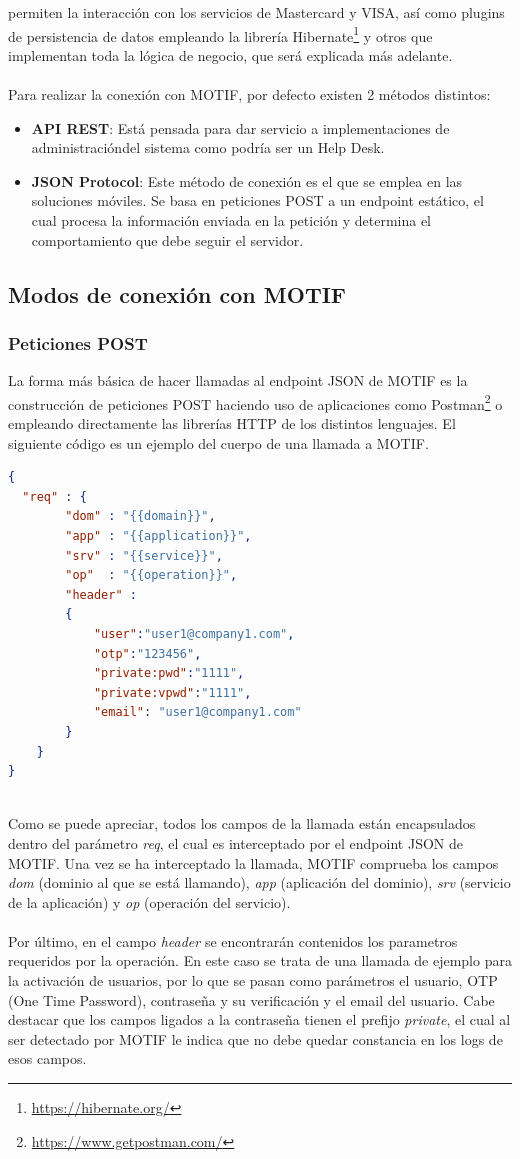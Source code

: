 \documentclass[a4paper, 12pt]{article}
\begin{document}
permiten la interacción con los servicios de Mastercard y VISA, así como plugins de persistencia de datos empleando
la librería Hibernate\footnote{\url{https://hibernate.org/}} y otros que implementan toda la lógica de negocio, que será explicada más adelante.
\\
\\
Para realizar la conexión con MOTIF, por defecto existen 2 métodos distintos:
\begin{itemize}
\item \textbf{API REST}: Está pensada para dar servicio a implementaciones de administracióndel sistema como podría ser un Help Desk.
\item \textbf{JSON Protocol}: Este método de conexión es el que se emplea en las soluciones móviles. Se basa en peticiones POST a un endpoint estático, el cual procesa la información enviada en la petición y determina el comportamiento que debe seguir el servidor.
\end{itemize}

\subsection{Modos de conexión con MOTIF}
\label{sec-2-3}
\subsubsection{Peticiones POST}
\label{sec-2-3-1}
La forma más básica de hacer llamadas al endpoint JSON de MOTIF es la construcción de peticiones POST haciendo uso
de aplicaciones como Postman\footnote{\url{https://www.getpostman.com/}} o empleando directamente las librerías HTTP de los distintos lenguajes.
El siguiente código es un ejemplo del cuerpo de una llamada a MOTIF.
\\
\begin{lstlisting}[language=json]
{
  "req" : {
        "dom" : "{{domain}}",
        "app" : "{{application}}",
        "srv" : "{{service}}",
        "op"  : "{{operation}}",
        "header" :
        {
            "user":"user1@company1.com",
            "otp":"123456",
            "private:pwd":"1111",
            "private:vpwd":"1111",
            "email": "user1@company1.com"
        }
    }
}
\end{lstlisting}
\\
Como se puede apreciar, todos los campos de la llamada están encapsulados dentro del parámetro \emph{req}, el cual
es interceptado por el endpoint JSON de MOTIF. Una vez se ha interceptado la llamada, MOTIF comprueba los campos
\emph{dom} (dominio al que se está llamando), \emph{app} (aplicación del dominio), \emph{srv} (servicio de la aplicación) y \emph{op}
(operación del servicio).
\\
\\
Por último, en el campo \emph{header} se encontrarán contenidos los parametros requeridos por la operación. En este caso
se trata de una llamada de ejemplo para la activación de usuarios, por lo que se pasan como parámetros el usuario,
OTP (One Time Password), contraseña y su verificación y el email del usuario. Cabe destacar que los campos ligados a
la contraseña tienen el prefijo \emph{private}, el cual al ser detectado por MOTIF le indica que no debe quedar constancia
en los logs de esos campos.
\end{document}
